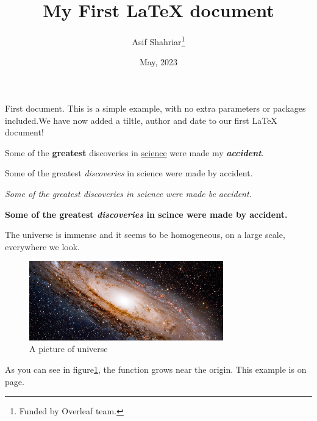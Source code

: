 \documentclass[12pt, a4paper]{article}
\title{My First LaTeX document}
\author{Asif Shahriar\thanks{Funded by Overleaf team.}}
\date{May, 2023}
\begin{document}
\maketitle
First document. This is a simple example, with no extra parameters
or packages included.We have now added a tiltle, author and date 
to our first \LaTeX{} document!


Some of the \textbf{greatest} discoveries in \underline{science}
were made my \textbf{\textit{accident}}. 

Some of the greatest \emph{discoveries} in science were made by
accident. 

\textit{Some of the greatest \emph{discoveries} in science were
made be accident.}

\textbf{Some of the greatest \emph{discoveries} in scince were made
by accident.}

The universe is immense and it seems to be homogeneous, on a large
scale, everywhere we look. 


\begin{figure}[h]
    \centering
    \includegraphics[width=0.75\textwidth]{universe}
    \caption{A picture of universe}
    \label{fig:universe1}
\end{figure}

As you can see in figure\ref{fig:universe1}, the function grows near
the origin. This example is on page\pageref{fig:universe1}. 
\end{document}
